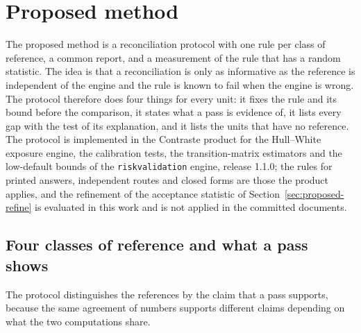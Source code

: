 \section{Proposed method}
\label{sec:proposed-method}

The proposed method is a reconciliation protocol with one rule per class of reference, a common report, and a measurement of the rule that has a random statistic. The idea is that a reconciliation is only as informative as the reference is independent of the engine and the rule is known to fail when the engine is wrong. The protocol therefore does four things for every unit: it fixes the rule and its bound before the comparison, it states what a pass is evidence of, it lists every gap with the test of its explanation, and it lists the units that have no reference. The protocol is implemented in the Contraste product for the Hull--White exposure engine, the calibration tests, the transition-matrix estimators and the low-default bounds of the \texttt{riskvalidation} engine, release 1.1.0; the rules for printed answers, independent routes and closed forms are those the product applies, and the refinement of the acceptance statistic of Section~\ref{sec:proposed-refine} is evaluated in this work and is not applied in the committed documents.

\subsection{Four classes of reference and what a pass shows}
\label{sec:proposed-classes}

The protocol distinguishes the references by the claim that a pass supports, because the same agreement of numbers supports different claims depending on what the two computations share.


